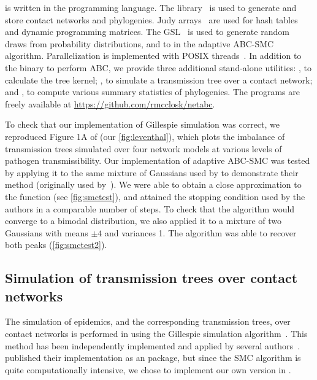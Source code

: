  is written in the  programming language. The
 library~\autocite{csardi2006igraph} is used to generate and
store contact networks and phylogenies. Judy arrays~\autocite{baskins2004judy}
are used for hash tables and dynamic programming matrices. The
\gls{GSL}~\autocite{gough2009gnu} is used to generate random draws from
probability distributions, and to   in the adaptive \gls{ABC}-\gls{SMC}
algorithm. Parallelization is implemented with \gls{POSIX}
threads~\autocite{barney2009posix}. In addition to the  binary
to perform \gls{ABC}, we provide three additional stand-alone utilities:
, to calculate the tree kernel; , to
simulate a transmission tree over a contact network; and ,
to compute various summary statistics of phylogenies. The programs are freely
available at \url{https://github.com/rmcclosk/netabc}.

To check that our implementation of Gillespie simulation was correct, we
reproduced Figure 1A of \textcite{leventhal2012inferring} (our
\cref{fig:leventhal}), which plots the imbalance of transmission trees
simulated over four network models at various levels of pathogen
transmissibility. Our implementation of adaptive \gls{ABC}-\gls{SMC} was tested
by applying it to the same mixture of Gaussians used by
\textcite{del2012adaptive} to demonstrate their method (originally used
by~\textcite{sisson2007sequential}). We were able to obtain a close
approximation to the function (see \cref{fig:smctest}), and attained the
stopping condition used by the authors in a comparable number of steps. To
check that the algorithm would converge to a bimodal distribution, we also
applied it to a mixture of two Gaussians with means $\pm4$ and variances 1. The
algorithm was able to recover both peaks (\cref{fig:smctest2}).

\subsection{Simulation of transmission trees over contact networks}
\label{subsec:nettree}

The simulation of epidemics, and the corresponding transmission trees, over
contact networks is performed in  using the Gillespie
simulation algorithm~\autocite{gillespie1976general}. This method has been
independently implemented and applied by several
authors~\autocite[\textit{e.g.}][]{o2011contact, robinson2013dynamics,
leventhal2012inferring, groendyke2011bayesian, villandre2016assessment}.
\textcite{groendyke2011bayesian} published their implementation as an
 package, but since the \gls{SMC} algorithm is quite
computationally intensive, we chose to implement our own version in
 .


